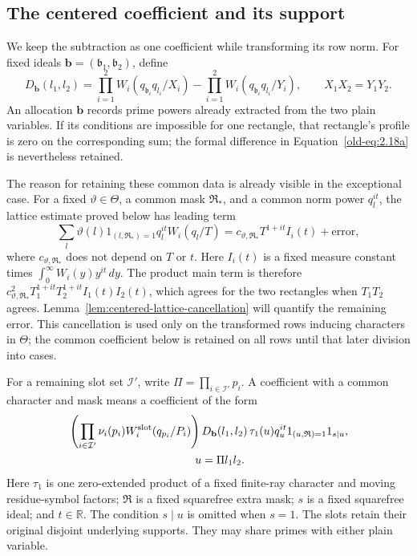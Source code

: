 \documentclass[11pt,a4paper]{article}
\numberwithin{equation}{section}
\numberwithin{figure}{section}
\theoremstyle{definition}
\theoremstyle{remark}
\begin{document}
\subsection{The centered coefficient and its support}

We keep the subtraction as one coefficient while transforming its row
norm.  For fixed ideals
\(\mathbf b=(\mathfrak b_1,\mathfrak b_2)\), define
\begin{equation}
 D_{\mathbf b}(l_1,l_2)
 =
 \prod_{i=1}^2W_i(q_{\mathfrak b_i}q_{l_i}/X_i)
 -
 \prod_{i=1}^2W_i(q_{\mathfrak b_i}q_{l_i}/Y_i),
 \qquad X_1X_2=Y_1Y_2.
 \label{old-eq:2.18a}
\end{equation}
An allocation \(\mathbf b\) records prime powers already extracted
from the two plain variables.  If its conditions are impossible for
one rectangle, that rectangle's profile is zero on the corresponding
sum; the formal difference in Equation~\eqref{old-eq:2.18a} is
nevertheless retained.

The reason for retaining these common data is already visible in the
exceptional case.  For a fixed \(\vartheta\in\Theta\), a common mask
\(\mathfrak R_*\), and a common norm power \(q_l^{it}\), the lattice
estimate proved below has leading term
\[
 \sum_l\vartheta(l)1_{(l,\mathfrak R_*)=1}q_l^{it}W_i(q_l/T)
 =c_{\vartheta,\mathfrak R_*}T^{1+it}I_i(t)+\text{error},
\]
where \(c_{\vartheta,\mathfrak R_*}\) does not depend on \(T\) or \(t\).
Here \(I_i(t)\) is a fixed measure constant times
\(\int_0^\infty W_i(y)y^{it}\,dy\).
The product main term is therefore
\(c_{\vartheta,\mathfrak R_*}^2T_1^{1+it}T_2^{1+it}I_1(t)I_2(t)\),
which agrees for the two rectangles when \(T_1T_2\) agrees.
Lemma~\ref{lem:centered-lattice-cancellation} will quantify the remaining
error.  This cancellation is used only on the transformed rows inducing
characters in \(\Theta\); the common coefficient below is retained on
all rows until that later division into cases.

For a remaining slot set \(\mathcal I'\), write
\(\Pi=\prod_{i\in\mathcal I'}p_i\).  A coefficient with a common
character and mask means a coefficient of the form
\begin{equation}
 \begin{split}
 &\left(\prod_{i\in\mathcal I'}
       \nu_i(p_i)W_i^{\rm slot}(q_{p_i}/P_i)\right)
 D_{\mathbf b}(l_1,l_2)\,
 \tau_1(u)q_u^{it}
 1_{(u,\mathfrak R)=1}1_{s\mid u},\\
 &\hspace{40mm}u=\Pi l_1l_2.
 \end{split}
 \label{eq:centered-coefficient-form}
\end{equation}
Here \(\tau_1\) is one zero-extended product of a fixed finite-ray
character and moving residue-symbol factors; \(\mathfrak R\) is a
fixed squarefree extra mask; \(s\) is a fixed squarefree ideal; and
\(t\in\mathbb R\).  The condition \(s\mid u\) is omitted when
\(s=1\).  The slots retain their original disjoint underlying
supports.  They may share primes with either plain variable.
\end{document}
